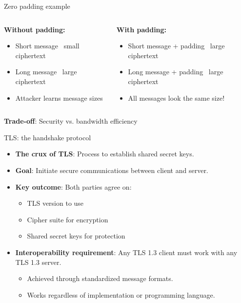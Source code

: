 \documentclass[aspectratio=169, lualatex, handout]{beamer}
\begin{document}
\begin{frame}{Zero padding example}
	\begin{columns}[c]
		\begin{column}{0.5\textwidth}
			\textbf{Without padding:}
			\begin{itemize}
				\item Short message \rightarrow\ small ciphertext
				\item Long message \rightarrow\ large ciphertext
				\item Attacker learns message sizes
			\end{itemize}
		\end{column}
		\begin{column}{0.5\textwidth}
			\textbf{With padding:}
			\begin{itemize}
				\item Short message + padding \rightarrow\ large ciphertext
				\item Long message + padding \rightarrow\ large ciphertext
				\item All messages look the same size!
			\end{itemize}
		\end{column}
	\end{columns}
	\pause
	\begin{center}
		\textbf{Trade-off}: Security vs. bandwidth efficiency
	\end{center}
\end{frame}

\begin{frame}{TLS: the handshake protocol}
	\begin{itemize}[<+->]
		\item \textbf{The crux of TLS}: Process to establish shared secret keys.
		\item \textbf{Goal}: Initiate secure communications between client and server.
		\item \textbf{Key outcome}: Both parties agree on:
		      \begin{itemize}
			      \item TLS version to use
			      \item Cipher suite for encryption
			      \item Shared secret keys for protection
		      \end{itemize}
		\item \textbf{Interoperability requirement}: Any TLS 1.3 client must work with any TLS 1.3 server.
		      \begin{itemize}
			      \item Achieved through standardized message formats.
			      \item Works regardless of implementation or programming language.
		      \end{itemize}
	\end{itemize}
\end{frame}
\end{document}
